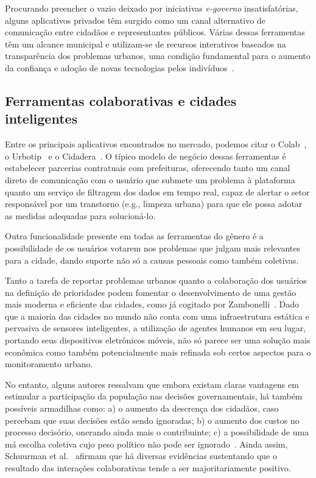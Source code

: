 \documentclass{sigchi}
\begin{document}
Procurando preencher o vazio deixado por iniciativas \textit{e-governo} insatisfatórias, alguns aplicativos privados têm surgido como um canal alternativo de comunicação entre cidadãos e representantes públicos. Várias dessas ferramentas têm um alcance municipal e utilizam-se de recursos interativos baseados na transparência dos problemas urbanos, uma condição fundamental para o aumento da confiança e adoção de novas tecnologias pelos indivíduos~\cite{carter:2005}.


\subsection{Ferramentas colaborativas e cidades inteligentes}
Entre os principais aplicativos encontrados no mercado, podemos citar o Colab~\cite{colab:2016}, o Urbotip~\cite{urbotip:2016} e o Cidadera~\cite{cidadera:2016}. O típico modelo de negócio dessas ferramentas é estabelecer parcerias contratuais com prefeituras, oferecendo tanto um canal direto de comunicação com o usuário que submete um problema à plataforma quanto um serviço de filtragem dos dados em tempo real, capaz de alertar o setor responsável por um transtorno (e.g., limpeza urbana) para que ele possa adotar as medidas adequadas para solucioná-lo.

Outra funcionalidade presente em todas as ferramentas do gênero é a possibilidade de os usuários votarem nos problemas que julgam mais relevantes para a cidade, dando suporte não só a causas pessoais como também coletivas. 

Tanto a tarefa de reportar problemas urbanos quanto a colaboração dos usuários na definição de prioridades podem fomentar o desenvolvimento de uma gestão mais moderna e eficiente das cidades, como já cogitado por Zambonelli~\cite{zambonelli:2011}. Dado que a maioria das cidades no mundo não conta com uma infraestrutura estática e pervasiva de sensores inteligentes, a utilização de agentes humanos em seu lugar, portando seus dispositivos eletrônicos móveis, não só parece ser uma solução mais econômica como também potencialmente mais refinada sob certos aspectos para o monitoramento urbano. 

No entanto, alguns autores ressalvam que embora existam claras vantagens em estimular a participação da população nas decisões governamentais, há também possíveis armadilhas como: a) o aumento da descrença dos cidadãos, caso percebam que suas decisões estão sendo ignoradas; b) o aumento dos custos no processo decisório, onerando ainda mais o contribuinte; c) a possibilidade de uma má escolha coletiva cujo peso político não pode ser ignorado~\cite{irvin:2004}. Ainda assim, Schuurman et al.~\cite{schuurman:2012} afirmam que há diversas evidências sustentando que o resultado das interações colaborativas tende a ser majoritariamente positivo.
\end{document}
